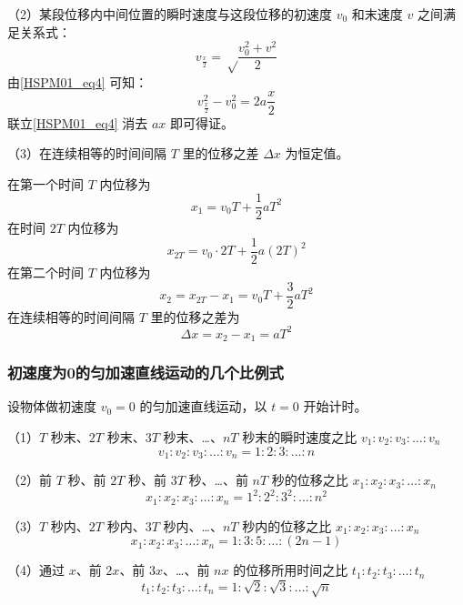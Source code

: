 （2）某段位移内中间位置的瞬时速度与这段位移的初速度 $v_0$ 和末速度 $v$ 之间满足关系式：
\begin{equation}
v_\frac x2=\sqrt \frac{v_0^2+v^2}2
\end{equation}
由\autoref{HSPM01_eq4} 可知：
\begin{equation}
v_{\frac x2}^2-v_0^2=2a\frac x2
\end{equation}
联立\autoref{HSPM01_eq4} 消去 $ax$ 即可得证。

（3）在连续相等的时间间隔 $T$ 里的位移之差 $\Delta x$ 为恒定值。

在第一个时间 $T$ 内位移为
\begin{equation}
x_1=v_0T+\frac12aT^2
\end{equation}
在时间 $2T$ 内位移为
\begin{equation}
x_{2T}=v_0\cdot2T+\frac12a(2T)^2
\end{equation}
在第二个时间 $T$ 内位移为
\begin{equation}
x_2=x_{2T}-x_1=v_0T+\frac32aT^2
\end{equation}
在连续相等的时间间隔 $T$ 里的位移之差为
\begin{equation}
\Delta x=x_2-x_1=aT^2
\end{equation}

\subsubsection{初速度为0的匀加速直线运动的几个比例式}
设物体做初速度 $v_0=0$ 的匀加速直线运动，以 $t=0$ 开始计时。

（1）$T$ 秒末、$2T$ 秒末、$3T$ 秒末、…、$nT$ 秒末的瞬时速度之比 $v_1:v_2:v_3:\dots:v_n$
\begin{equation}
v_1:v_2:v_3:\dots:v_n=1:2:3:\dots:n
\end{equation}

（2）前 $T$ 秒、前 $2T$ 秒、前 $3T$ 秒、…、前 $nT$ 秒的位移之比 $x_1:x_2:x_3:\dots:x_n$
\begin{equation}
x_1:x_2:x_3:\dots:x_n=1^2:2^2:3^2:\dots:n^2
\end{equation}

（3）$T$ 秒内、$2T$ 秒内、$3T$ 秒内、…、$nT$ 秒内的位移之比 $x_1:x_2:x_3:\dots:x_n$
\begin{equation}
x_1:x_2:x_3:\dots:x_n=1:3:5:\dots:(2n-1)
\end{equation}

（4）通过 $x$、前 $2x$、前 $3x$、…、前 $nx$ 的位移所用时间之比 $t_1:t_2:t_3:\dots:t_n$
\begin{equation}
t_1:t_2:t_3:\dots:t_n=1:\sqrt{2}:\sqrt{3}:\dots:\sqrt{n}
\end{equation}

